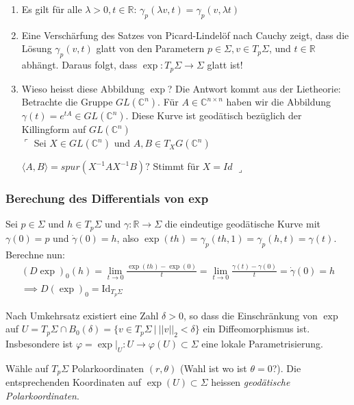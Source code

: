 \documentclass[../main.tex]{subfiles}
\begin{document}
\begin{remarks}

\leavevmode
\begin{enumerate}
    \item Es gilt für alle $\lambda > 0, t \in \mathbb{R}$: $\gamma_p(\lambda v, t) = \gamma_p(v,\lambda t)$
    \item Eine Verschärfung des Satzes von Picard-Lindelöf nach Cauchy zeigt,
    dass die Lösung $\gamma_p(v,t)$ glatt von den Parametern $p \in \Sigma, v \in T_p\Sigma$, und
    $t\in \mathbb{R}$ abhängt. Daraus folgt, dass $\exp : T_p\Sigma \to \Sigma$ glatt ist!

    \item Wieso heisst diese Abbildung $\exp$?
    Die Antwort kommt aus der Lietheorie: 
    Betrachte die Gruppe $GL(\mathbb{C}^n)$. Für $A \in \mathbb{C}^{n \times n}$ haben
    wir die Abbildung $\gamma(t)= e^{tA} \in GL(\mathbb{C}^n)$.
    Diese Kurve ist geodätisch bezüglich der Killingform auf $GL(\mathbb{C}^n)$\\
    $\ulcorner$ Sei $X \in GL(\mathbb{C}^n)$ und $A,B \in T_XG(\mathbb{C}^n)$

    $\langle A, B \rangle = spur (X^{-1}AX^{-1}B)?$ Stimmt für $X = Id$
    $\lrcorner$ 
\end{enumerate}

\end{remarks}

\subsubsection*{Berechung des Differentials von exp} 
Sei $p \in \Sigma$ und $h \in T_p\Sigma$ und $\gamma : \mathbb{R} \to \Sigma$
die eindeutige geodätische Kurve mit $\gamma(0)=p$ und $ \dot{\gamma}(0)=h$, also
$\exp (th)= \gamma_p(th,1) = \gamma_p(h,t)=\gamma(t)$.
Berechne nun:
\begin{align*}
    (D\exp)_0(h) = \lim_{t \to 0}\frac{\exp(th)-\exp(0)}{t} =
    \lim_{t \to 0} \frac{\gamma(t)-\gamma(0)}{t} =\dot{\gamma}(0)=h \\
    \implies D(\exp)_0 = \text{Id}_{T_p\Sigma}  
\end{align*}

Nach Umkehrsatz existiert eine Zahl $\delta > 0$, so dass die Einschränkung
von $\exp$ auf $U=T_p\Sigma \cap B_0(\delta) = \{v \in T_p\Sigma \ | \ ||v||_2 < \delta \}$
ein Diffeomorphismus ist. Insbesondere ist 
$\varphi = \exp \vert_U : U \to \varphi(U) \subset \Sigma$ eine lokale Parametrisierung. \\
\begin{minipage}{30em}
    Wähle auf $T_p\Sigma$ Polarkoordinaten $(r, \theta)$ (Wahl ist wo ist $\theta = 0$?).
Die entsprechenden Koordinaten auf $\exp (U) \subset \Sigma$ heissen \emph{geodätische
Polarkoordinaten}.
\end{minipage}
\begin{minipage}{10em}
\end{minipage}
\end{document}
